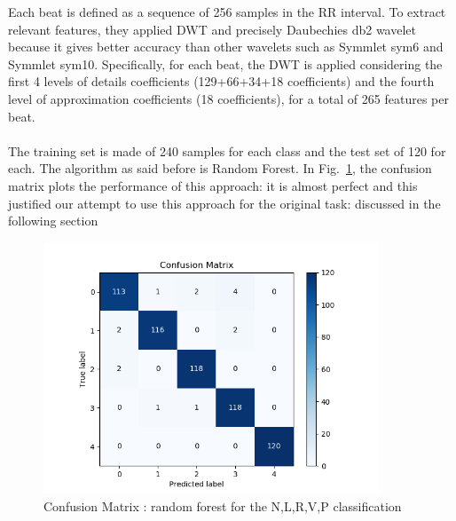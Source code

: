 \documentclass[LaM,binding=0.6cm]{sapthesis}
\begin{document}
Each beat is defined as a sequence of 256 samples in the RR interval. To extract relevant features, they applied DWT and precisely Daubechies db2 wavelet because it gives better accuracy than other wavelets such as Symmlet sym6 and Symmlet sym10. Specifically, for each beat, the DWT is applied considering the first 4 levels of details coefficients (129+66+34+18 coefficients) and the fourth level of approximation coefficients (18 coefficients), for a total of 265 features per beat.\\\\The training set is made of 240 samples for each class and the test set of 120 for each. The algorithm as said before is Random Forest. In Fig.~\ref{fig:rf2}, the confusion matrix plots the performance of this approach: it is almost perfect and this justified our attempt to use this approach for the original task: discussed in the following section
\begin{figure} \centering
    \includegraphics[width=100mm,scale=0.7]{confusion-matrix-dwt-random-forest-paper.png}
    \caption{Confusion Matrix : random forest for the N,L,R,V,P classification}
    \label{fig:rf2}
\end{figure}
\end{document}
